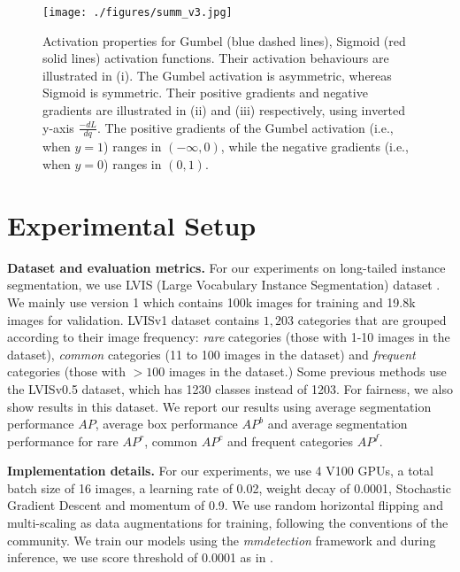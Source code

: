 \documentclass[runningheads]{llncs}
\begin{document}
\begin{figure}
    \texttt{[image: ./figures/summ\_v3.jpg]}
    \caption{Activation properties for Gumbel (blue dashed lines), Sigmoid (red solid lines) activation functions. Their activation behaviours are illustrated in (i). The Gumbel activation is asymmetric, whereas Sigmoid is symmetric. Their positive gradients and negative gradients are illustrated in (ii) and (iii) respectively, using inverted y-axis $\frac{-dL}{dq}$. The positive gradients of the Gumbel activation (i.e.,  when $y=1$) ranges in $(-\infty,0)$, while the negative gradients (i.e.,  when $y=0$) ranges in $(0,1)$.}
    \label{fig:activation_summary_figures}
\end{figure}

\section{Experimental Setup}
\label{sec:experimental_setup}

\noindent\textbf{Dataset and evaluation metrics.}
For our experiments on long-tailed instance segmentation, we use LVIS (Large Vocabulary Instance Segmentation) dataset \cite{gupta2019lvis}. We mainly use version 1 which contains 100k images for training and 19.8k images for validation. LVISv1 dataset contains $1,203$ categories that are grouped according to their image frequency: \textit{rare} categories (those with 1-10 images in the dataset), \textit{common} categories (11 to 100 images in the dataset) and \textit{frequent} categories (those with $>100$ images in the dataset.) Some previous methods use the LVISv0.5 dataset, which has 1230 classes instead of 1203.  For fairness, we also show results in this dataset. 
We report our results using average segmentation performance $AP$, average box performance $AP^b$ and average segmentation performance for rare $AP^r$, common $AP^c$ and frequent categories $AP^f$. 



\noindent\textbf{Implementation details.}
For our experiments, we use 4 V100 GPUs, a total batch size of 16 images, a learning rate of 0.02, weight decay of 0.0001, Stochastic Gradient Descent and momentum of 0.9. We use random horizontal flipping and multi-scaling as data augmentations for training, following the conventions of the community. We train our models using the \textit{mmdetection} framework \cite{mmdetection} and during inference, we use score threshold of 0.0001 as in \cite{gupta2019lvis}.
\end{document}
